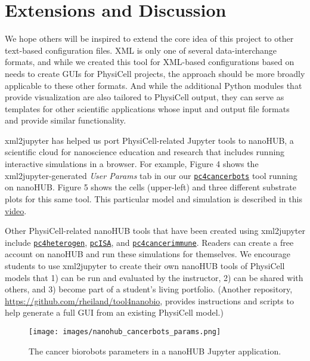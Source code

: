 \documentclass[10pt,letterpaper]{article}
\begin{document}
\section*{Extensions and Discussion}

We hope others will be inspired to extend the core idea of this project
to other text-based configuration files. XML is only one of several
data-interchange formats, and while we
created this tool for XML-based configurations based on needs to create
GUIs for PhysiCell projects, the approach should be more broadly
applicable to these other formats. And while the additional Python
modules that provide visualization are also tailored to PhysiCell
output, they can serve as templates for other scientific applications
whose input and output file formats and provide similar functionality.

xml2jupyter has helped us port PhysiCell-related Jupyter tools to
nanoHUB, a scientific cloud for nanoscience education and research that
includes running interactive simulations in a browser. For example,
Figure 4 shows the xml2jupyter-generated \emph{User Params} tab in our
our
\href{https://nanohub.org/tools/pc4cancerbots}{\texttt{pc4cancerbots}}
tool running on nanoHUB. Figure 5 shows the cells (upper-left) and three
different substrate plots for this same tool. This particular model and
simulation is described in this
\href{https://www.youtube.com/watch?v=wuDZ40jW__M}{video}.

Other PhysiCell-related nanoHUB tools that have been created using
xml2jupyter include
\href{https://nanohub.org/tools/pc4heterogen}{\texttt{pc4heterogen}},
\href{https://nanohub.org/tools/pcisa}{\texttt{pcISA}}, and
\href{https://nanohub.org/tools/pc4cancerimmune}{\texttt{pc4cancerimmune}}.
Readers can create a free account on nanoHUB and run these simulations
for themselves. We encourage students to use xml2jupyter to create their
own nanoHUB tools of PhysiCell models that 1) can be run and evaluated
by the instructor, 2) can be shared with others, and 3) become part of a
student's living portfolio. (Another repository,
\url{https://github.com/rheiland/tool4nanobio}, provides instructions
and scripts to help generate a full GUI from an existing PhysiCell
model.)

\begin{figure}
\centering
\texttt{[image: images/nanohub\_cancerbots\_params.png]}
\caption{The cancer biorobots parameters in a nanoHUB Jupyter
application.}
\end{figure}
\end{document}
